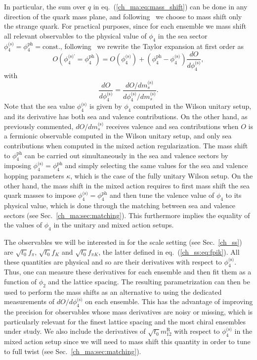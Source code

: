 In particular, the sum over $q$ in eq.~(\ref{ch_ma:eq:mass_shift}) can be done in any direction of the quark mass plane, and following~\citep{Strassberger:2021tsu} we choose to mass shift only the strange quark. For practical purposes, since for each ensemble we mass shift all relevant observables to the physical value of $\phi_4$ in the sea sector $\phi_4^{\textrm{(s)}}=\phi_4^{\textrm{ph}}={\textrm{const.}}$, following~\citep{Strassberger:2023xnj} we rewrite the Taylor expansion at first order as
\begin{equation}
{O}\left(\phi_4^{\textrm{(s)'}}=\phi_4^{\textrm{ph}}\right)={O}\left(\phi_4^{\textrm{(s)}}\right)+\left(\phi_4^{\textrm{ph}}-\phi_4^{\textrm{(s)}}\right)\frac{d{O}}{d\phi_4^{\textrm{(s)}}},
\end{equation}
with
\begin{equation}
\label{ch_ma:eq:dOdphi4}
\frac{d{O}}{d\phi_4^{\textrm{(s)}}}=\frac{d{O}/dm_s^{\textrm{(s)}}}{d\phi_4^{\textrm{(s)}}/dm_s^{\textrm{(s)}}}.
\end{equation}
Note that the sea value $\phi_4^{\textrm{(s)}}$ is given by $\phi_4$ computed in the Wilson unitary setup, and its derivative has both sea and valence contributions. On the other hand, as previously commented, $d{O}/dm_s^{\textrm{(s)}}$ receives valence and sea contributions when ${O}$ is a fermionic observable computed in the Wilson unitary setup, and only sea contributions when computed in the mixed action regularization. The mass shift to $\phi_4^{\textrm{ph}}$ can be carried out simultaneously in the sea and valence sectors by imposing $\phi_4^{\textrm{(s)}}=\phi_4^{\textrm{ph}}$ and simply selecting the same values for the sea and valence hopping parameters $\kappa$, which is the case of the fully unitary Wilson setup. On the other hand, the mass shift in the mixed action requires to first mass shift the sea quark masses to impose $\phi_4^{\textrm{(s)}}=\phi_4^{\textrm{ph}}$ and then tune the valence value of $\phi_4$ to its physical value, which is done through the matching between sea and valence sectors (see Sec.~\ref{ch_ma:sec:matching}). This furthermore implies the equality of the values of $\phi_4$ in the unitary and mixed action setups.

The observables we will be interested in for the scale setting (see Sec.~\ref{ch_ss}) are $\sqrt{t_0}f_{\pi}$, $\sqrt{t_0}f_{K}$ and $\sqrt{t_0}f_{\pi K}$, the latter defined in eq.~(\ref{ch_ss:eq:fpik}). All these quantities are physical and so are their derivatives with respect to $\phi_4^{\textrm{(s)}}$. Thus, one can measure these derivatives for each ensemble and then fit them as a function of $\phi_2$ and the lattice spacing. The resulting parametrization can then be used to perform the mass shifts as an alternative to using the dedicated measurements of $dO/d\phi_4^{\textrm{(s)}}$ on each ensemble. This has the advantage of improving the precision for observables whose mass derivatives are noisy or missing, which is particularly relevant for the finest lattice spacing and the most chiral ensembles under study.  We also include the derivatives of $\sqrt{t_0}m_{12}^{\textrm{R}}$ with respect to $\phi_4^{\textrm{(s)}}$ in the mixed action setup since we will need to mass shift this quantity in order to tune to full twist (see Sec.~\ref{ch_ma:sec:matching}).

